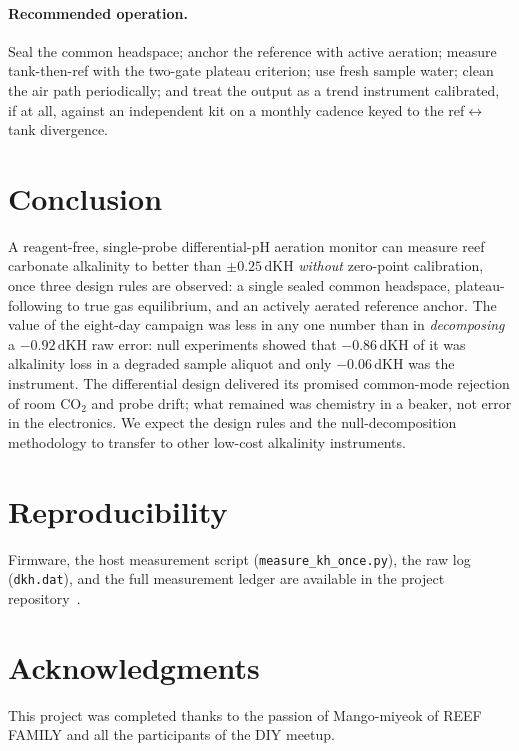 \documentclass[11pt]{article}
\newcommand{\dkh}{\ensuremath{\,\mathrm{dKH}}}
\newcommand{\co}{\ensuremath{\mathrm{CO_2}}}
\begin{document}
\paragraph{Recommended operation.} Seal the common headspace; anchor the
reference with active aeration; measure tank-then-ref with the two-gate plateau
criterion; use fresh sample water; clean the air path periodically; and treat
the output as a trend instrument calibrated, if at all, against an independent
kit on a monthly cadence keyed to the ref$\leftrightarrow$tank divergence.

\section{Conclusion}
A reagent-free, single-probe differential-pH aeration monitor can measure reef
carbonate alkalinity to better than $\pm0.25\dkh$ \emph{without} zero-point
calibration, once three design rules are observed: a single sealed common
headspace, plateau-following to true gas equilibrium, and an actively aerated
reference anchor. The value of the eight-day campaign was less in any one number
than in \emph{decomposing} a $-0.92\dkh$ raw error: null experiments showed that
$-0.86\dkh$ of it was alkalinity loss in a degraded sample aliquot and only
$-0.06\dkh$ was the instrument. The differential design delivered its promised
common-mode rejection of room \co{} and probe drift; what remained was chemistry
in a beaker, not error in the electronics. We expect the design rules and the
null-decomposition methodology to transfer to other low-cost alkalinity
instruments.

\section*{Reproducibility}
Firmware, the host measurement script (\texttt{measure\_kh\_once.py}), the raw
log (\texttt{dkh.dat}), and the full measurement ledger are available in the
project repository~\cite{repo}.

\section*{Acknowledgments}
This project was completed thanks to the passion of Mango-miyeok of REEF FAMILY
and all the participants of the DIY meetup.
\end{document}
